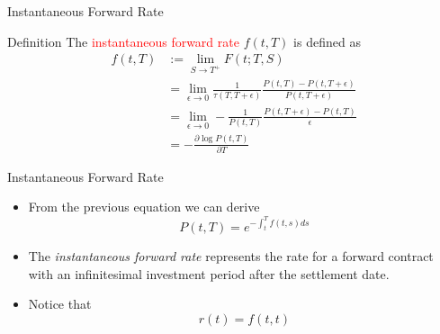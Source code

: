 \documentclass{beamer}
\begin{document}
\begin{frame}{Instantaneous Forward Rate}
	\begin{block}{Definition}
	The \textcolor{red}{instantaneous forward rate} $f(t, T)$ is defined as 
	\begin{equation}
		\begin{aligned}
			f(t, T) &:= \lim_{S\rightarrow T^+} F(t;T,S) \\
			& = \lim_{\epsilon\rightarrow 0}  \frac{1}{\tau(T,T+\epsilon)}\frac{P(t,T)-P(t,T+\epsilon)}{P(t,T+\epsilon)} \\
			& = \lim_{\epsilon\rightarrow 0} - \frac{1}{P(t,T)} \frac{P(t,T+\epsilon)-P(t,T)}{\epsilon} \\
			& = -\frac{\partial \log P(t, T)}{\partial T}
		\end{aligned}
	\end{equation}
	\end{block}
\end{frame}

\begin{frame}{Instantaneous Forward Rate}
	\begin{itemize}
		\item From the previous equation we can derive
		\begin{equation}
			P(t, T) = e^{-\int_t^T f(t, s) ds}
		\end{equation}
		\item The \emph{instantaneous forward rate} represents the rate for a forward contract with an infinitesimal investment period after the settlement date.
		\item Notice that
		\begin{equation*}
			r(t) = f(t,t)
		\end{equation*}
	\end{itemize}
\end{frame}
\end{document}
